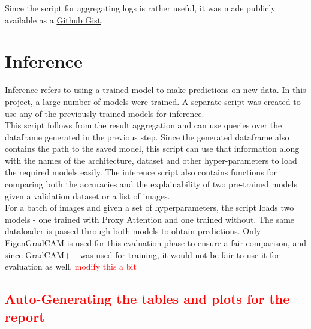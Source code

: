 Since the script for aggregating logs is rather useful, it was made publicly available as a \href{https://gist.github.com/SubhadityaMukherjee/58cbdf324812175233e91993b720e0bc}{Github Gist}.

\section{Inference}
Inference refers to using a trained model to make predictions on new data. In this project, a large number of models were trained. A separate script was created to use any of the previously trained models for inference.\\
This script follows from the result aggregation and can use queries over the dataframe generated in the previous step. Since the generated dataframe also contains the path to the saved model, this script can use that information along with the names of the architecture, dataset and other hyper-parameters to load the required models easily.
The inference script also contains functions for comparing both the accuracies and the explainability of two pre-trained models given a validation dataset or a list of images.\\
For a batch of images and given a set of hyperparameters, the script loads two models - one trained with Proxy Attention and one trained without. The same dataloader is passed through both models to obtain predictions. Only EigenGradCAM is used for this evaluation phase to ensure a fair comparison, and since GradCAM++ was used for training, it would not be fair to use it for evaluation as well. \textcolor{red}{modify this a bit}

\textcolor{red}{\section{Auto-Generating the tables and plots for the report}}